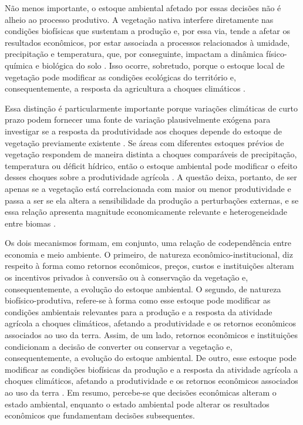 Não menos importante, o estoque ambiental afetado por essas decisões não é alheio ao processo produtivo. A vegetação nativa interfere diretamente nas condições biofísicas que sustentam a produção e, por essa via, tende a afetar os resultados econômicos, por estar associada a processos relacionados à umidade, precipitação e temperatura, que, por conseguinte, impactam a dinâmica físico-química e biológica do solo \cite{SpracklenEtAl2012,JoshiGarkoti2023}. Isso ocorre, sobretudo, porque o estoque local de vegetação pode modificar as condições ecológicas do território e, consequentemente, a resposta da agricultura a choques climáticos \cite{RedheadEtAl2020}. %

Essa distinção é particularmente importante porque variações climáticas de curto prazo podem fornecer uma fonte de variação plausivelmente exógena para investigar se a resposta da produtividade aos choques depende do estoque de vegetação previamente existente \cite{DellEtAl2014}. Se áreas com diferentes estoques prévios de vegetação respondem de maneira distinta a choques comparáveis de precipitação, temperatura ou déficit hídrico, então o estoque ambiental pode modificar o efeito desses choques sobre a produtividade agrícola \cite{RedheadEtAl2020}. A questão deixa, portanto, de ser apenas se a vegetação está correlacionada com maior ou menor produtividade e passa a ser se ela altera a sensibilidade da produção a perturbações externas, e se essa relação apresenta magnitude economicamente relevante e heterogeneidade entre biomas \cite{RedheadEtAl2020,XiaoEtAl2023}. %

Os dois mecanismos formam, em conjunto, uma relação de codependência entre economia e meio ambiente. O primeiro, de natureza econômico-institucional, diz respeito à forma como retornos econômicos, preços, custos e instituições alteram os incentivos privados à conversão ou à conservação da vegetação e, consequentemente, a evolução do estoque ambiental. O segundo, de natureza biofísico-produtiva, refere-se à forma como esse estoque pode modificar as condições ambientais relevantes para a produção e a resposta da atividade agrícola a choques climáticos, afetando a produtividade e os retornos econômicos associados ao uso da terra. Assim, de um lado, retornos econômicos e instituições condicionam a decisão de converter ou conservar a vegetação e, consequentemente, a evolução do estoque ambiental. De outro, esse estoque pode modificar as condições biofísicas da produção e a resposta da atividade agrícola a choques climáticos, afetando a produtividade e os retornos econômicos associados ao uso da terra \cite{BermanEtAl2023,RedheadEtAl2020}. Em resumo, percebe-se que decisões econômicas alteram o estado ambiental, enquanto o estado ambiental pode alterar os resultados econômicos que fundamentam decisões subsequentes. %

